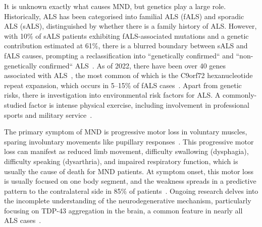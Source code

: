 It is unknown exactly what causes MND, but genetics play a large role.
Historically, ALS has been categorised into familial ALS (fALS) and sporadic ALS (sALS), distinguished by whether there is a family history of ALS.
However, with 10\% of sALS patients exhibiting fALS-associated mutations and a genetic contribution estimated at 61\%, there is a blurred boundary between sALS and fALS causes, prompting a reclassification into ``genetically confirmed`` and ``non-genetically confirmed`` ALS~\cite{hanbyRiskRelativesPatients2011, al-chalabiEstimateAmyotrophicLateral2010, feldmanAmyotrophicLateralSclerosis2022}.
As of 2022, there have been over 40 genes associated with ALS~\cite{goutmanRecentAdvancesDiagnosis2022a}, the most common of which is the C9orf72 hexanucleotide repeat expansion, which occurs in 5--15\% of fALS cases~\cite{vanesAmyotrophicLateralSclerosis2017}.
Apart from genetic risks, there is investigation into environmental risk factors for ALS. A commonly-studied factor is intense physical exercise, including involvement in professional sports and military service~\cite{mckayMilitaryServiceRelated2021, lacortePhysicalActivityPhysical2016}.


The primary symptom of MND is progressive motor loss in voluntary muscles, sparing involuntary movements like pupillary responses~\cite{vanesAmyotrophicLateralSclerosis2017}.
This progressive motor loss can manifest as reduced limb movement, difficulty swallowing (dysphagia), difficulty speaking (dysarthria), and impaired respiratory function, which is usually the cause of death for MND patients.
At symptom onset, this motor loss is usually focused on one body segment, and the weakness spreads in a predictive pattern to the contralateral side in 85\% of patients~\cite{walhoutPatternsSymptomDevelopment2018}.
Ongoing research delves into the incomplete understanding of the neurodegenerative mechanism, particularly focusing on TDP-43 aggregation in the brain, a common feature in nearly all ALS cases~\cite{blokhuisProteinAggregationAmyotrophic2013}.

